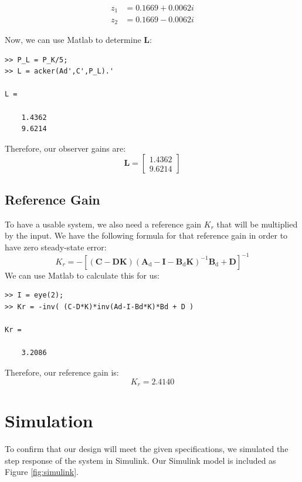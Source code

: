 \documentclass[11pt]{article}
\begin{document}
\begin{align*}
z_1 &= 0.1669 + 0.0062i \\ z_2 &= 0.1669 - 0.0062i
\end{align*}

Now, we can use Matlab to determine {\bf L}:
\small
\begin{verbatim}
>> P_L = P_K/5;
>> L = acker(Ad',C',P_L).'

L =

    1.4362
    9.6214
\end{verbatim}

Therefore, our observer gains are:
\[\mathbf{L} = 
    \begin{bmatrix}
       1.4362 \\
       9.6214
    \end{bmatrix}
\]

\subsection*{Reference Gain}
To have a usable system, we also need a reference gain $K_r$ that will be multiplied by the input.
We have the following formula for that reference gain in order to have zero steady-state error:
\[K_r = -\mathbf{\left[(C-DK)(A_\mathrm{d}-I-B_\mathrm{d}K)^\mathrm{-1}B_\mathrm{d}+D\right]}^{-1}\]
We can use Matlab to calculate this for us:
\small
\begin{verbatim}
>> I = eye(2);
>> Kr = -inv( (C-D*K)*inv(Ad-I-Bd*K)*Bd + D )

Kr =

    3.2086
\end{verbatim}
Therefore, our reference gain is:
\[K_r = 2.4140\]
\pagebreak\section*{Simulation}
To confirm that our design will meet the given specifications, we simulated the step response of the system in Simulink.
Our Simulink model is included as Figure \ref{fig:simulink}. \\
\end{document}

